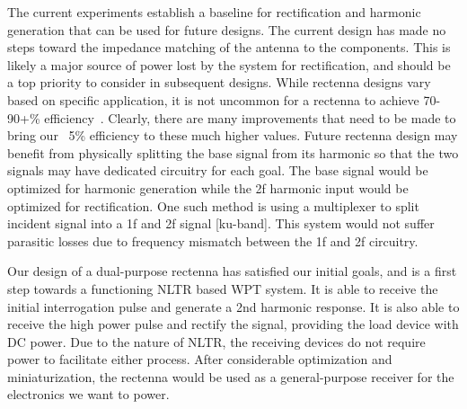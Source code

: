 The current experiments establish a baseline for rectification and harmonic generation that can be used for future designs. The current design has made no steps toward the impedance matching of the antenna to the components. This is likely a major source of power lost by the system for rectification, and should be a top priority to consider in subsequent designs. While rectenna designs vary based on specific application, it is not uncommon for a rectenna to achieve 70-90+\% efficiency~\cite{class-e, novel-multi-coil}. Clearly, there are many improvements that need to be made to bring our ~5\% efficiency to these much higher values.
Future rectenna design may benefit from physically splitting the base signal from its harmonic so that the two signals may have dedicated circuitry for each goal. The base signal would be optimized for harmonic generation while the 2f harmonic input would be optimized for rectification. One such method is using a multiplexer to split incident signal into a 1f and 2f signal [ku-band]. This system would not suffer parasitic losses due to frequency mismatch between the 1f and 2f circuitry.


Our design of a dual-purpose rectenna has satisfied our initial goals, and is a first step towards a functioning NLTR based WPT system.  It is able to receive the initial interrogation pulse and generate a 2nd harmonic response. It is also able to receive the high power pulse and rectify the signal, providing the load device with DC power. Due to the nature of NLTR, the receiving devices do not require power to facilitate either process. After considerable optimization and miniaturization, the rectenna would be used as a general-purpose receiver for the electronics we want to power.
